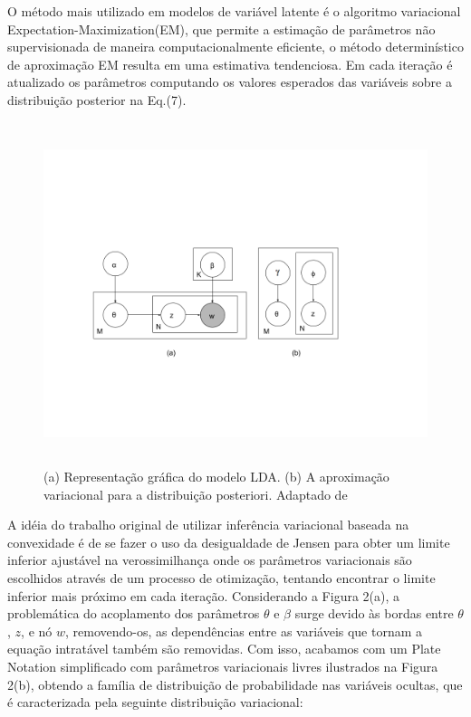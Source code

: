 \documentclass[12pt,a4paper]{article}
\begin{document}
  O método mais utilizado em modelos de variável latente é o algoritmo variacional Expectation-Maximization(EM), que permite a estimação de parâmetros não supervisionada de maneira computacionalmente eficiente, o método determinístico de aproximação EM resulta em uma estimativa tendenciosa. Em cada iteração é atualizado os parâmetros computando os valores esperados das variáveis sobre a distribuição posterior na Eq.(7).
  
  
  \begin{figure}[h]
    \centering
      \includegraphics[height=10cm]{images/figure_2.png}
      \caption{(a) Representação gráfica do modelo LDA. (b) A aproximação variacional para a distribuição posteriori. Adaptado de }
  \end{figure}
  
  A idéia do trabalho original de utilizar inferência variacional baseada na convexidade é de se fazer o uso da desigualdade de Jensen para obter um limite inferior ajustável na verossimilhança \cite{jordan1999introduction} onde os parâmetros variacionais são escolhidos através de um processo de otimização, tentando encontrar o limite inferior mais próximo em cada iteração. Considerando a Figura 2(a), a problemática do acoplamento dos parâmetros $\theta$ e $\beta$ surge devido às bordas entre $\theta$, $z$, e nó $w$, removendo-os, as dependências entre as variáveis que tornam a equação intratável também são removidas. Com isso, acabamos com um Plate Notation simplificado com parâmetros variacionais livres ilustrados na Figura 2(b), obtendo a família de distribuição de probabilidade nas variáveis ocultas, que é caracterizada pela seguinte distribuição variacional:
  
\end{document}
